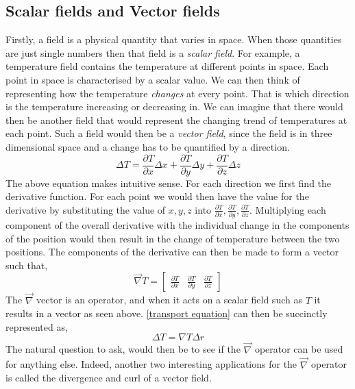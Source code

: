 \documentclass[a4paper, reqno, 12pt, openbib]{article} %
\begin{document}
\subsection{Scalar fields and Vector fields} 
Firstly, a field is a physical quantity that varies in space. When those quantities are just single numbers then that field is a \emph{scalar field}. For example, a temperature field contains the temperature at different points in space. Each point in space is characterised by a scalar value. We can then think of representing how the temperature \emph{changes} at every point. That is which direction is the temperature increasing or decreasing in. We can imagine that there would then be another field that would represent the changing trend of temperatures at each point. Such a field would then be a \emph{vector field}, since the field is in three dimensional space and a change has to be quantified by a direction.
\begin{equation}
	\label{transport equation}
	\Delta T = \frac{\partial T}{\partial x}\Delta x +  \frac{\partial T}{\partial y}\Delta y + \frac{\partial T}{\partial z}\Delta z
\end{equation}
The above equation makes intuitive sense. For each direction we first find the derivative function. For each point we would then have the value for the derivative by substituting the value of $x,y, z$ into $\frac{\partial T}{\partial x}, \frac{\partial T}{\partial y}, \frac{\partial T}{\partial z}$. Multiplying each component of the overall derivative with the individual change in the components of the position would then result in the change of temperature between the two positions. The components of the derivative can then be made to form a vector such that, 
\begin{equation}
	  \vec{\nabla}T = 
	  \begin{bmatrix} 
	  	\frac{\partial T}{\partial x} & \frac{\partial T}{\partial y} & \frac{\partial T}{\partial z}
	  \end{bmatrix}
\end{equation}
The $\vec{\nabla}$ vector is an operator, and when it acts on a scalar field such as $T$ it results in a vector as seen above. \autoref{transport equation} can then be succinctly represented as, 
\begin{equation}
	\Delta T = \nabla T \Delta r
\end{equation}
The natural question to ask, would then be to see if the $\vec{\nabla}$ operator can be used for anything else. Indeed, another two interesting applications for the $\vec{\nabla}$ operator is called the divergence and curl of a vector field.\\
\end{document}
